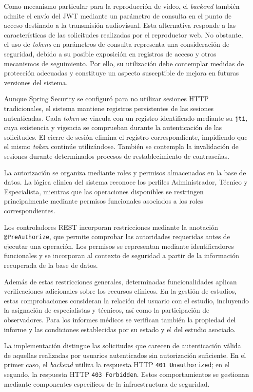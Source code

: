 Como mecanismo particular para la reproducción de video,
el \textit{backend} también admite el envío del JWT mediante un
parámetro de consulta en el punto de acceso destinado
a la transmisión audiovisual. Esta alternativa responde
a las características de las solicitudes realizadas por
el reproductor web. No obstante, el uso de \textit{tokens} en
parámetros de consulta representa una consideración
de seguridad, debido a su posible exposición en registros
de acceso y otros mecanismos de seguimiento. Por ello,
su utilización debe contemplar medidas de protección
adecuadas y constituye un aspecto susceptible de mejora
en futuras versiones del sistema.


Aunque Spring Security se configuró para no utilizar
sesiones HTTP tradicionales, el sistema mantiene registros
persistentes de las sesiones autenticadas. Cada \textit{token}
se vincula con un registro identificado mediante su
\texttt{jti}, cuya existencia y vigencia se comprueban
durante la autenticación de las solicitudes. El cierre
de sesión elimina el registro correspondiente, impidiendo
que el mismo \textit{token} continúe utilizándose. También se
contempla la invalidación de sesiones durante determinados
procesos de restablecimiento de contraseñas.

La autorización se organiza mediante roles y permisos
almacenados en la base de datos. La lógica clínica del
sistema reconoce los perfiles Administrador, Técnico
y Especialista, mientras que las operaciones disponibles
se restringen principalmente mediante permisos
funcionales asociados a los roles correspondientes.

Los controladores REST incorporan restricciones mediante
la anotación \texttt{@PreAuthorize}, que permite comprobar
las autoridades requeridas antes de ejecutar una operación.
Los permisos se representan mediante identificadores
funcionales y se incorporan al contexto de seguridad
a partir de la información recuperada de la base de datos.

Además de estas restricciones generales, determinadas
funcionalidades aplican verificaciones adicionales sobre
los recursos clínicos. En la gestión de estudios, estas
comprobaciones consideran la relación del usuario con
el estudio, incluyendo la asignación de especialistas
y técnicos, así como la participación de observadores.
Para los informes médicos se verifican también la
propiedad del informe y las condiciones establecidas
por su estado y el del estudio asociado.

La implementación distingue las solicitudes que carecen
de autenticación válida de aquellas realizadas por
usuarios autenticados sin autorización suficiente.
En el primer caso, el \textit{backend} utiliza la respuesta HTTP
\texttt{401 Unauthorized}; en el segundo, la respuesta
HTTP \texttt{403 Forbidden}. Estos comportamientos
se gestionan mediante componentes específicos de
la infraestructura de seguridad.

